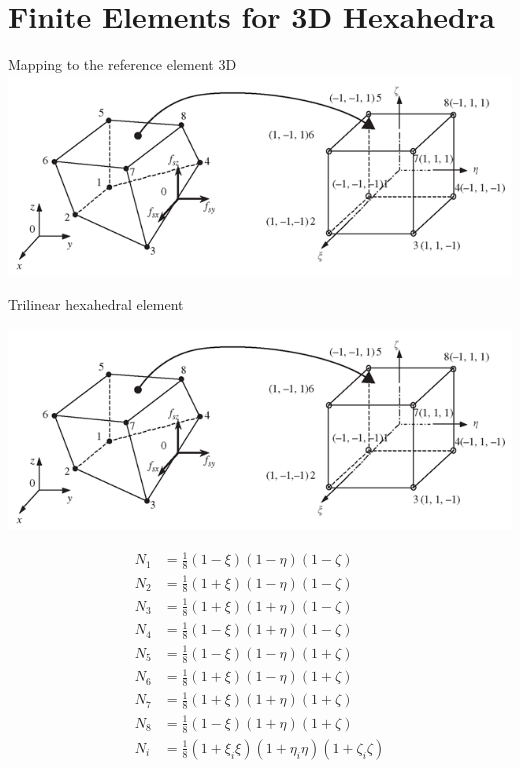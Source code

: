 \documentclass[handout]{beamer}
{
\usepackage{fullpage}
\usepackage{hyperref}
\usepackage{amssymb} 
}
\begin{document}
\section{Finite Elements for 3D Hexahedra}



\begin{frame}{Mapping to the reference element 3D}
\includegraphics[width=\textwidth]{figures/FEmappingHex.png}
\end{frame}


\begin{frame}{Trilinear hexahedral element}
\centering
\begin{minipage}{0.6\textwidth}
    \includegraphics[width=\textwidth]{figures/FEmappingHex.png}
\end{minipage}
\begin{minipage}{0.35\textwidth}
{\scriptsize
\begin{align*}
N_1 &= \frac{1}{8}(1 - \xi)(1 - \eta)(1 - \zeta) \\
N_2 &= \frac{1}{8}(1 + \xi)(1 - \eta)(1 - \zeta) \\ 
N_3 &= \frac{1}{8}(1 + \xi)(1 + \eta)(1 - \zeta) \\
N_4 &= \frac{1}{8}(1 - \xi)(1 + \eta)(1 - \zeta) \\
N_5 &= \frac{1}{8}(1 - \xi)(1 - \eta)(1 + \zeta) \\
N_6 &= \frac{1}{8}(1 + \xi)(1 - \eta)(1 + \zeta) \\ 
N_7 &= \frac{1}{8}(1 + \xi)(1 + \eta)(1 + \zeta) \\
N_8 &= \frac{1}{8}(1 - \xi)(1 + \eta)(1 + \zeta) \\
N_i &= \frac{1}{8}(1 + \xi_i\xi)(1 + \eta_i\eta)(1 + \zeta_i\zeta)
\end{align*}
}
\end{minipage}

\end{frame}
\end{document}
